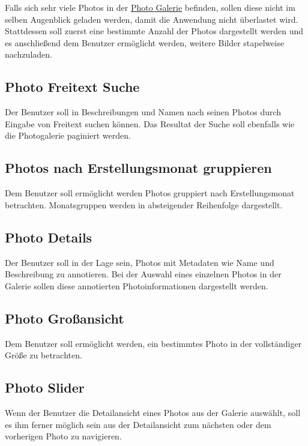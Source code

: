Falls sich sehr viele Photos in der \hyperref[sec:spec:photo_gallery]{Photo Galerie} befinden, sollen diese nicht im selben Augenblick geladen werden, damit die Anwendung nicht überlastet wird. Stattdessen soll zuerst eine bestimmte Anzahl der Photos dargestellt werden und es anschließend dem Benutzer ermöglicht werden, weitere Bilder stapelweise nachzuladen.

\subsection{Photo Freitext Suche}
\label{sec:spec:photo_search}

Der Benutzer soll in Beschreibungen und Namen nach seinen Photos durch Eingabe von Freitext suchen können. Das Resultat der Suche soll ebenfalls wie die Photogalerie paginiert werden.

\subsection{Photos nach Erstellungsmonat gruppieren}
\label{sec:spec:photo_groups}

Dem Benutzer soll ermöglicht werden Photos gruppiert nach Erstellungsmonat betrachten. Monatsgruppen werden in absteigender Reihenfolge dargestellt.

\subsection{Photo Details}
\label{sec:spec:photo_details}

Der Benutzer soll in der Lage sein, Photos mit Metadaten wie Name und Beschreibung zu annotieren. Bei der Auswahl eines einzelnen Photos in der Galerie sollen diese annotierten Photoinformationen dargestellt werden.

\subsection{Photo Großansicht}

Dem Benutzer soll ermöglicht werden, ein bestimmtes Photo in der vollständiger Größe zu betrachten.

\subsection{Photo Slider}
\label{sec:spec:photo_slider}

Wenn der Benutzer die Detailansicht eines Photos aus der Galerie auswählt, soll es ihm ferner möglich sein aus der Detailansicht zum nächsten oder dem vorherigen Photo zu navigieren.
